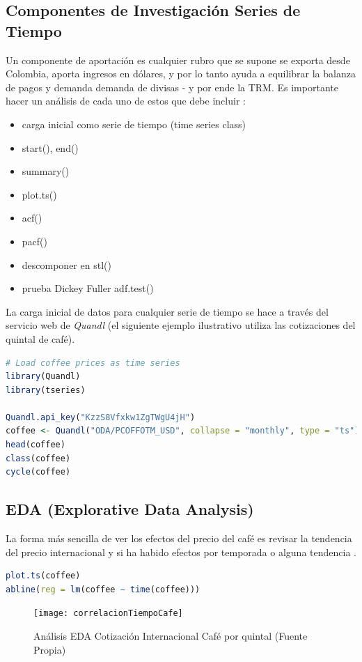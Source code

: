 \subsection{Componentes de Investigación Series de Tiempo}
Un componente de aportación es cualquier rubro que se supone se exporta desde Colombia, aporta ingresos en dólares, y por lo tanto ayuda a equilibrar la balanza de pagos y demanda demanda de divisas - y por ende la TRM. Es importante hacer un análisis de cada uno de estos que debe incluir \cite{zumelMount}:

\begin{itemize}
	\item carga inicial como serie de tiempo (time series class)
	\item start(), end()
    \item summary()
    \item plot.ts()
    \item acf()
    \item pacf()
    \item descomponer en stl()
    \item prueba Dickey Fuller adf.test()
\end{itemize}

La carga inicial de datos para cualquier serie de tiempo se hace a través del servicio web de \textit{Quandl} (el siguiente ejemplo ilustrativo utiliza las cotizaciones del quintal de café).

\begin{lstlisting}[language=R]
# Load coffee prices as time series
library(Quandl)
library(tseries)

Quandl.api_key("KzzS8Vfxkw1ZgTWgU4jH")
coffee <- Quandl("ODA/PCOFFOTM_USD", collapse = "monthly", type = "ts")
head(coffee)
class(coffee)
cycle(coffee)
\end{lstlisting}

\subsection{EDA (Explorative Data Analysis)}
La forma más sencilla de ver los efectos del precio del café es revisar la tendencia del precio internacional y si ha habido efectos por temporada o alguna tendencia \cite{daroczi}.

\begin{lstlisting}[language=R]
plot.ts(coffee)
abline(reg = lm(coffee ~ time(coffee)))
\end{lstlisting}

\begin{figure}[H]
	\centering
	\texttt{[image: correlacionTiempoCafe]}
	\caption{Análisis EDA Cotización Internacional Café por quintal  (Fuente Propia)}
\end{figure}

